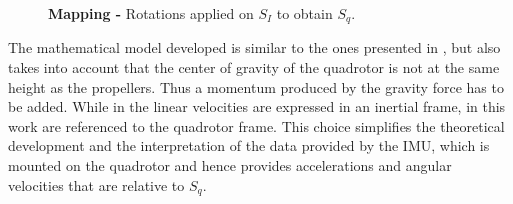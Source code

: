 \documentclass[conference]{IEEEtran}
\begin{document}
\begin{figure}[h!]
  \centering
  \vspace{-10pt}
  \caption{\textbf{Mapping -} Rotations applied on $S_I$ to obtain $S_q$.}
  \label{fig:rotaciones}
\end{figure}

The mathematical model developed is similar to the ones presented in \cite{bib:quadrotor-bible, bib:curso_quad}, but also takes into account that the center of gravity of the quadrotor is not at the same height as the propellers. Thus a momentum produced by the gravity force has to be added. While in \cite{bib:curso_quad} the linear velocities are expressed in an inertial frame, in this work are referenced to the quadrotor frame. This choice simplifies the theoretical development and the interpretation of the data provided by the IMU, which is mounted on the quadrotor and hence provides accelerations and angular velocities that are relative to $S_q$.
\end{document}
